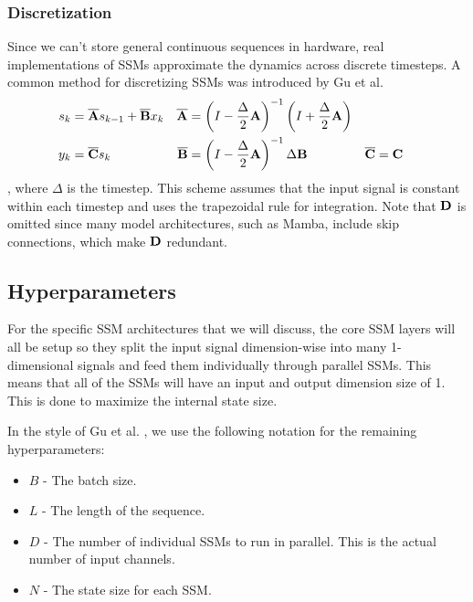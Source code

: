 \subsubsection{Discretization}
Since we can't store general continuous sequences in hardware, real
implementations of SSMs approximate the dynamics across discrete timesteps.
A common method for discretizing SSMs was introduced by Gu et al. \cite{s4}
$$\begin{aligned}
    s_k &= \overline {{\mathbf{A}}} s_{k-1} + \overline {{\mathbf{B}}} x_k
    &
    \overline {{\mathbf{A}}} &=
    \left(I - \frac{\Delta}{2}{\mathbf{A}}\right)^{-1}
    \left(I + \frac{\Delta}{2}{\mathbf{A}}\right)
    \\
    y_k &= \overline {{\mathbf{C}}} s_k
    &
    \overline {{\mathbf{B}}} &=
    \left(I - \frac{\Delta}{2}{\mathbf{A}}\right)^{-1}
    \Delta {\mathbf{B}}
    &
    \overline {{\mathbf{C}}} &= {\mathbf{C}}
\end{aligned}$$
, where $\Delta$ is the timestep.
This scheme assumes that the input signal is constant within each timestep and
uses the trapezoidal rule for integration.
Note that ${\mathbf{D}}$ is omitted since many model architectures, such as Mamba,
include skip connections, which make ${\mathbf{D}}$ redundant.

\subsection{Hyperparameters}
For the specific SSM architectures that we will discuss, the core SSM layers
will all be setup so they split the input signal dimension-wise into many
1-dimensional signals and feed them individually through parallel SSMs.
This means that all of the SSMs will have an input and output dimension size of
1.
This is done to maximize the internal state size.

In the style of Gu et al. \cite{s4}, we use the following notation for the
remaining hyperparameters:
\begin{itemize}
    \item $B$ - The batch size.
    \item $L$ - The length of the sequence.
    \item $D$ - The number of individual SSMs to run in parallel. This is the
    actual number of input channels.
    \item $N$ - The state size for each SSM.
\end{itemize}

